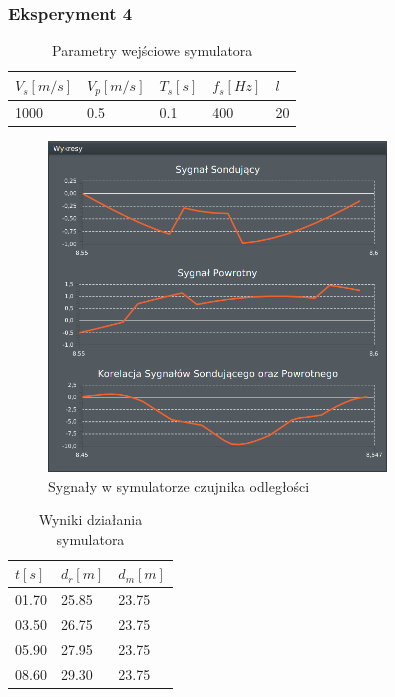 \documentclass[12pt]{article}
\begin{document}
{{            \subsubsection{Eksperyment 4} {
                \begin{table}[H]
                    \centering
                    \begin{tabular}{|l|l|l|l|l|}
                        \hline
                        $V_s[m/s]$ & $V_p[m/s]$ & $T_s[s]$ & $f_s[Hz]$ & $l$ \\ \hline
                        1000       & 0.5        & 0.1      & 400       & 20 \\ \hline
                    \end{tabular}
                    \caption{Parametry wejściowe symulatora}
                \end{table}
                \begin{figure}[H]
                    \centering
                    \includegraphics[width=0.8\textwidth]{img/result/simulation/experiment4.png}
                    \caption{Sygnały w symulatorze czujnika odległości}
                \end{figure}
                \begin{table}[H]
                    \centering
                    \begin{tabular}{|l|l|l|}
                        \hline
                        $t[s]$ & $d_r[m]$ & $d_m[m]$ \\ \hline
                        01.70  & 25.85    & 23.75    \\ \hline
                        03.50  & 26.75    & 23.75    \\ \hline
                        05.90  & 27.95    & 23.75    \\ \hline
                        08.60  & 29.30    & 23.75    \\ \hline
                    \end{tabular}
                    \caption{Wyniki działania symulatora}
                \end{table}
            }
            \newpage

}}
\end{document}
